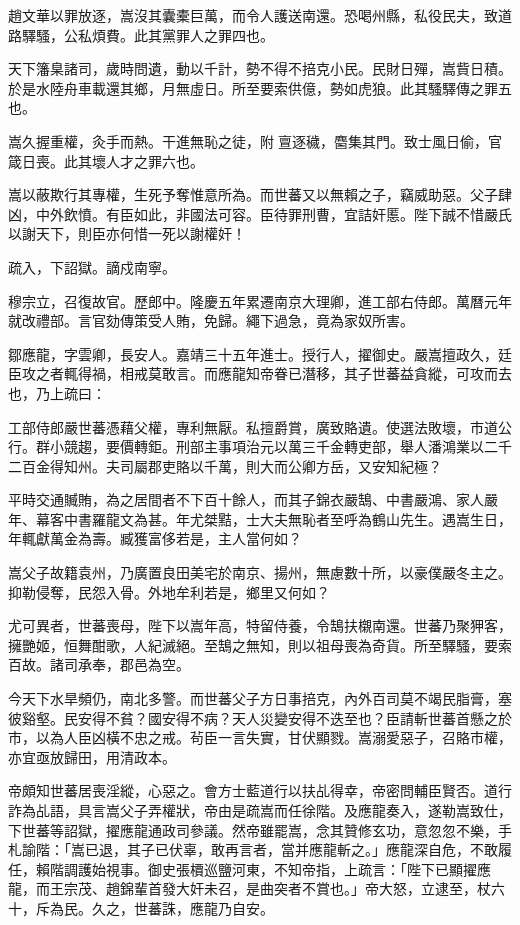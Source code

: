 \begin{pinyinscope}
趙文華以罪放逐，嵩沒其囊橐巨萬，而令人護送南還。恐喝州縣，私役民夫，致道路驛騷，公私煩費。此其黨罪人之罪四也。

天下籓臬諸司，歲時問遺，動以千計，勢不得不掊克小民。民財日殫，嵩貲日積。於是水陸舟車載還其鄉，月無虛日。所至要索供億，勢如虎狼。此其騷驛傳之罪五也。

嵩久握重權，灸手而熱。干進無恥之徒，附亶逐穢，麕集其門。致士風日偷，官箴日喪。此其壞人才之罪六也。

嵩以蔽欺行其專權，生死予奪惟意所為。而世蕃又以無賴之子，竊威助惡。父子肆凶，中外飲憤。有臣如此，非國法可容。臣待罪刑曹，宜詰奸慝。陛下誠不惜嚴氏以謝天下，則臣亦何惜一死以謝權奸！

疏入，下詔獄。謫戍南寧。

穆宗立，召復故官。歷郎中。隆慶五年累遷南京大理卿，進工部右侍郎。萬曆元年就改禮部。言官劾傳策受人賄，免歸。繩下過急，竟為家奴所害。

鄒應龍，字雲卿，長安人。嘉靖三十五年進士。授行人，擢御史。嚴嵩擅政久，廷臣攻之者輒得禍，相戒莫敢言。而應龍知帝眷已潛移，其子世蕃益貪縱，可攻而去也，乃上疏曰：

工部侍郎嚴世蕃憑藉父權，專利無厭。私擅爵賞，廣致賂遺。使選法敗壞，市道公行。群小競趨，要價轉鉅。刑部主事項治元以萬三千金轉吏部，舉人潘鴻業以二千二百金得知州。夫司屬郡吏賂以千萬，則大而公卿方岳，又安知紀極？

平時交通贓賄，為之居間者不下百十餘人，而其子錦衣嚴鵠、中書嚴鴻、家人嚴年、幕客中書羅龍文為甚。年尤桀黠，士大夫無恥者至呼為鶴山先生。遇嵩生日，年輒獻萬金為壽。臧獲富侈若是，主人當何如？

嵩父子故籍袁州，乃廣置良田美宅於南京、揚州，無慮數十所，以豪僕嚴冬主之。抑勒侵奪，民怨入骨。外地牟利若是，鄉里又何如？

尤可異者，世蕃喪母，陛下以嵩年高，特留侍養，令鵠扶櫬南還。世蕃乃聚狎客，擁艷姬，恒舞酣歌，人紀滅絕。至鵠之無知，則以祖母喪為奇貨。所至驛騷，要索百故。諸司承奉，郡邑為空。

今天下水旱頻仍，南北多警。而世蕃父子方日事掊克，內外百司莫不竭民脂膏，塞彼谿壑。民安得不貧？國安得不病？天人災變安得不迭至也？臣請斬世蕃首懸之於市，以為人臣凶橫不忠之戒。茍臣一言失實，甘伏顯戮。嵩溺愛惡子，召賂市權，亦宜亟放歸田，用清政本。

帝頗知世蕃居喪淫縱，心惡之。會方士藍道行以扶乩得幸，帝密問輔臣賢否。道行詐為乩語，具言嵩父子弄權狀，帝由是疏嵩而任徐階。及應龍奏入，遂勒嵩致仕，下世蕃等詔獄，擢應龍通政司參議。然帝雖罷嵩，念其贊修玄功，意忽忽不樂，手札諭階：「嵩已退，其子已伏辜，敢再言者，當并應龍斬之。」應龍深自危，不敢履任，賴階調護始視事。御史張檟巡鹽河東，不知帝指，上疏言：「陛下已顯擢應龍，而王宗茂、趙錦輩首發大奸未召，是曲突者不賞也。」帝大怒，立逮至，杖六十，斥為民。久之，世蕃誅，應龍乃自安。


\end{pinyinscope}

